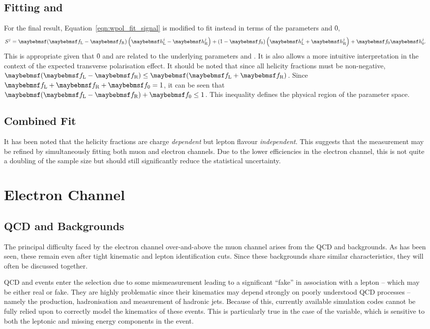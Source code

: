 \subsection[Fitting \fLmfR and \f0]{Fitting \boldmath{\fLmfR} and }
\label{sec:wpol_fit_fmfr}
For the final result, Equation~\ref{eqn:wpol_fit_signal} is modified to fit
instead in terms of the parameters \fLmfR and \f0,
\begin{equation*}
S^j = \fLmfR \left (\hLj -\hRj\right) + \left(1-\f0\right)\left(\hLj +\hRj\right) +\f0\hZj.
\end{equation*}
This is appropriate given that \f0 and \fLmfR are related to the underlying
parameters \Azero and \Afour. It is also allows a more intuitive interpretation
in the context of the expected transverse polarisation effect. It should be
noted that since all helicity fractions must be non-negative,
$\fLmfR\leq\fLpfR$. Since $\fL +\fR + \f0 = 1$, it can be seen that $\fLmfR +
\f0 \leq 1$. This inequality defines the physical region of the parameter space.

\subsection{Combined Fit}
It has been noted that the helicity fractions are charge \emph{dependent} but
lepton flavour \emph{independent}. This suggests that the measurement may be
refined by simultaneously fitting both muon and electron channels. Due to the
lower efficiencies in the electron channel, this is not quite a doubling of the
sample size but should still significantly reduce the statistical uncertainty.

\section{Electron Channel}
\subsection[\acs{QCD} and \texorpdfstring{\gammajets}{Photon+Jets} Backgounds]{\acs{QCD} and \boldmath{\gammajets} Backgrounds}
The principal difficulty faced by the electron channel over-and-above the muon
channel arises from the \ac{QCD} and \gammajets backgrounds. As has been seen,
these remain even after tight kinematic and lepton identification cuts. Since
these backgrounds share similar characteristics, they will often be discussed
together.

\ac{QCD} and \gammajets events enter the selection due to some mismeasurement
leading to a significant ``fake'' \PtW in association with a lepton -- which may
be either real or fake. They are highly problematic since their kinematics may
depend strongly on poorly understood \ac{QCD} processes -- namely the
production, hadronisation and measurement of hadronic jets. Because of this,
currently available simulation codes cannot be fully relied upon to correctly
model the kinematics of these events. This is particularly true in the case of
the \LP variable, which is sensitive to both the leptonic and missing energy
components in the event.

